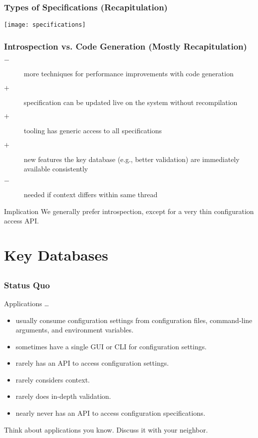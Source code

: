 \begin{frame}
	\frametitle{Types of Specifications (Recapitulation)}
	\texttt{[image: specifications]}
\end{frame}


\begin{frame}
	\frametitle{Introspection vs. Code Generation (Mostly Recapitulation)}

	\pause

	\begin{description} %
	\item[$-$] more techniques for performance improvements with code generation
	\item[$+$] specification can be updated live on the system without recompilation
	\item[$+$] tooling has generic access to all specifications
 	\item[$+$] new features the key database (e.g., better validation) are immediately available consistently
	\item[$-$] \color{red} needed if context differs within same thread
	\end{description}

	\vspace{0.5em}

	\begin{alertblock}{Implication}
	We generally prefer introspection, except for a very thin configuration access API.
	\end{alertblock}
\end{frame}


\section{Key Databases}

\subsection{}

\begin{frame}
	\frametitle{Status Quo}

	Applications \dots

	\begin{itemize}
	\item usually consume configuration settings from configuration files, command-line arguments, and environment variables.
	\item sometimes have a single GUI or CLI for configuration settings.
	\item rarely has an API to access configuration settings.
	\item rarely considers context.
	\item rarely does in-depth validation.
	\item nearly never has an API to access configuration specifications.
	\end{itemize}

	\begin{task}
	Think about applications you know.
	Discuss it with your neighbor.
	\end{task}
\end{frame}

